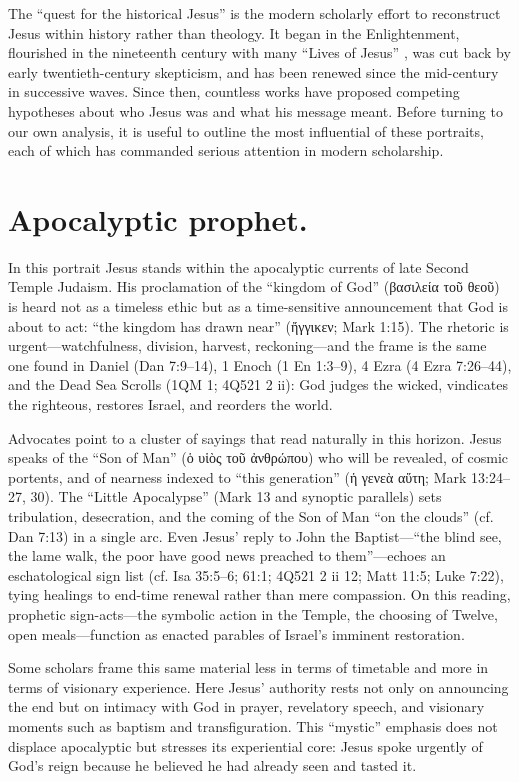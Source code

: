 The “quest for the historical Jesus” is the modern scholarly effort to reconstruct Jesus within history rather than theology.
It began in the Enlightenment, flourished in the nineteenth century with many “Lives of Jesus” \cite{schweitzer:quest}, was cut back by early twentieth-century skepticism, and has been renewed since the mid-century in successive waves.
Since then, countless works have proposed competing hypotheses about who Jesus was and what his message meant.
Before turning to our own analysis, it is useful to outline the most influential of these portraits, each of which has commanded serious attention in modern scholarship.

\section{Apocalyptic prophet.}\label{sec:apocalyptic}

In this portrait Jesus stands within the apocalyptic currents of late Second Temple Judaism.
His proclamation of the “kingdom of God” (βασιλεία τοῦ θεοῦ) is heard not as a timeless ethic but as a time-sensitive announcement that God is about to act: “the kingdom has drawn near” (ἤγγικεν; Mark 1:15).
The rhetoric is urgent---watchfulness, division, harvest, reckoning---and the frame is the same one found in Daniel (Dan 7:9--14), 1 Enoch (1 En 1:3--9), 4 Ezra (4 Ezra 7:26--44), and the Dead Sea Scrolls (1QM 1; 4Q521 2 ii): God judges the wicked, vindicates the righteous, restores Israel, and reorders the world.

Advocates point to a cluster of sayings that read naturally in this horizon.
Jesus speaks of the “Son of Man” (ὁ υἱὸς τοῦ ἀνθρώπου) who will be revealed, of cosmic portents, and of nearness indexed to “this generation” (ἡ γενεὰ αὕτη; Mark 13:24--27, 30).
The “Little Apocalypse” (Mark 13 and synoptic parallels) sets tribulation, desecration, and the coming of the Son of Man “on the clouds” (cf. Dan 7:13) in a single arc.
Even Jesus’ reply to John the Baptist---“the blind see, the lame walk, the poor have good news preached to them”---echoes an eschatological sign list (cf. Isa 35:5--6; 61:1; 4Q521 2 ii 12; Matt 11:5; Luke 7:22), tying healings to end-time renewal rather than mere compassion.
On this reading, prophetic sign-acts---the symbolic action in the Temple, the choosing of Twelve, open meals---function as enacted parables of Israel’s imminent restoration.

Some scholars frame this same material less in terms of timetable and more in terms of visionary experience.
Here Jesus’ authority rests not only on announcing the end but on intimacy with God in prayer, revelatory speech, and visionary moments such as baptism and transfiguration.
This “mystic” emphasis does not displace apocalyptic but stresses its experiential core: Jesus spoke urgently of God’s reign because he believed he had already seen and tasted it.

